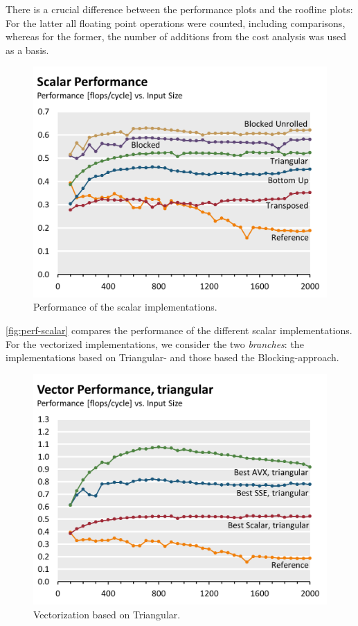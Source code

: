 There is a crucial difference between the performance plots and the roofline
plots: For the latter all floating point operations were counted, including
comparisons, whereas for the former, the number of additions from the cost
analysis was used as a basis.

\begin{figure}[htb]\centering
  \includegraphics[width=\linewidth]{plot_data/scalar_performance.png}
  \caption{Performance of the scalar implementations.}
  \label{fig:perf-scalar}
\end{figure}

\autoref{fig:perf-scalar} compares the performance of the different scalar
implementations. For the vectorized implementations, we consider the two
\emph{branches}: the implementations based on Triangular- and those based the
Blocking-approach.

\begin{figure}[htb]\centering
  \includegraphics[width=\linewidth]{plot_data/triangular_vector_performance.png}
  \caption{Vectorization based on Triangular.}
  \label{fig:perf-triangular}
\end{figure}

